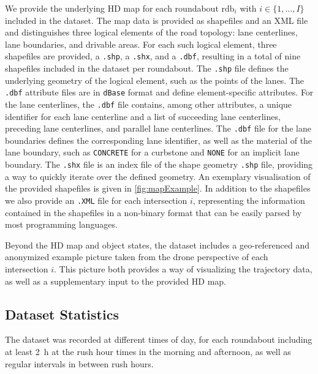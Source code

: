 \documentclass[a4paper, 10pt, conference]{ieeeconf}      %
\begin{document}
We provide the underlying HD map for each roundabout $\text{rdb}_i$ with $i \in\{1,\dots,I\}$ included in the dataset.
The map data is provided as shapefiles and an \gls{XML} file and distinguishes three logical elements of the road topology: lane centerlines, lane boundaries, and drivable areas.
For each such logical element, three shapefiles are provided, a \texttt{.shp}, a \texttt{.shx}, and a \texttt{.dbf}, resulting in a total of nine shapefiles included in the dataset per roundabout.
The \texttt{.shp} file defines the underlying geometry of the logical element, such as the points of the lanes. 
The \texttt{.dbf} attribute files are in \texttt{dBase} format and define element-specific attributes.
For the lane centerlines, the \texttt{.dbf} file contains, among other attributes, a unique identifier for each lane centerline and a list of succeeding lane centerlines, preceding lane centerlines, and parallel lane centerlines.
The \texttt{.dbf} file for the lane boundaries defines the corresponding lane identifier, as well as the material of the lane boundary, such as \texttt{CONCRETE} for a curbstone and \texttt{NONE} for an implicit lane boundary.
The \texttt{.shx} file is an index file of the shape geometry \texttt{.shp} file, providing a way to quickly iterate over the defined geometry.
An exemplary visualisation of the provided shapefiles is given in \autoref{fig:mapExample}.
In addition to the shapefiles we also provide an \texttt{.\gls{XML}} file for each intersection $i$, representing the information contained in the shapefiles in a non-binary format that can be easily parsed by most programming languages.

Beyond the HD map and object states, the dataset includes a geo-referenced and anonymized example picture taken from the drone perspective of each intersection $i$.
This picture both provides a way of visualizing the trajectory data, as well as a supplementary input to the provided HD map.


\subsection{Dataset Statistics} \label{sec:datasetStatistics}
The dataset was recorded at different times of day, for each roundabout including at least \SI{2}{\hour} at the rush hour times in the morning and afternoon, as well as regular intervals in between rush hours.
\end{document}
